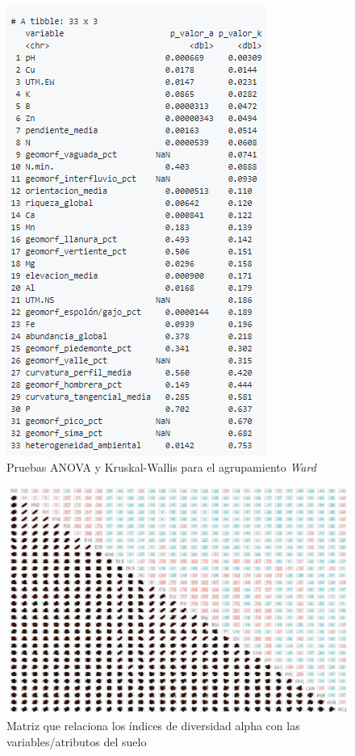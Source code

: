 \documentclass[11pt,]{article}
\begin{document}
\begin{figure}
\centering
\includegraphics{anova_kruskalwallis_ward.png}
\caption{Pruebas ANOVA y Kruskal-Wallis para el agrupamiento \emph{Ward}
\label{fig:anova_kruskalwallis_ward}}
\end{figure}

\begin{figure}
\centering
\includegraphics{pearson_indcdiversidad.png}
\caption{Matriz que relaciona los índices de diversidad alpha con las
variables/atributos del suelo \label{fig:pearson_div}}
\end{figure}
\end{document}
